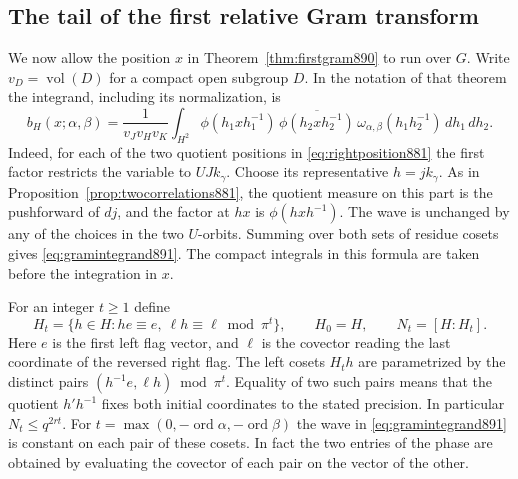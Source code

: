 \documentclass[a4paper,11pt]{article}
\theoremstyle{definition}
\theoremstyle{remark}
\numberwithin{equation}{section}
\begin{document}
\subsection{The tail of the first relative Gram transform}
\label{sec:gramtail891}

We now allow the position \(x\) in Theorem~\ref{thm:firstgram890}
to run over \(G\). Write \(v_D=\operatorname{vol}(D)\) for a compact
open subgroup \(D\). In the notation of that theorem the integrand,
including its normalization, is
\begin{equation}
 b_H(x;\alpha,\beta)=\frac{1}{v_Jv_Hv_K}
   \int_{H^2}\phi(h_1xh_1^{-1})\,
       \overline{\phi(h_2xh_2^{-1})}\,
       \omega_{\alpha,\beta}(h_1h_2^{-1})\,dh_1\,dh_2 .
 \label{eq:gramintegrand891}
\end{equation}
Indeed, for each of the two quotient positions in
\eqref{eq:rightposition881} the first factor restricts the
variable to \(U J k_\gamma\). Choose its representative \(h=j k_\gamma\).
As in Proposition~\ref{prop:twocorrelations881}, the quotient
measure on this part is the pushforward of \(dj\), and the factor
at \(hx\) is \(\phi(hxh^{-1})\). The wave is unchanged by any
of the choices in the two \(U\)-orbits. Summing over both
sets of residue cosets gives \eqref{eq:gramintegrand891}.
The compact integrals in this formula are taken before the
integration in \(x\).

For an integer \(t\ge1\) define
\[
 H_t=\{h\in H:he\equiv e,\ \ell h\equiv\ell\bmod\pi^t\},
 \qquad H_0=H,\qquad N_t=[H:H_t].
\]
Here \(e\) is the first left flag vector, and \(\ell\) is the
covector reading the last coordinate of the reversed right flag.
The left cosets \(H_t h\) are parametrized by the distinct pairs
\((h^{-1}e,\ell h)\bmod\pi^t\). Equality of two such pairs means
that the quotient \(h'h^{-1}\) fixes both initial coordinates to
the stated precision. In particular \(N_t\le q^{2rt}\).
For \(t=\max(0,-\operatorname{ord}\alpha,-\operatorname{ord}\beta)\)
the wave in \eqref{eq:gramintegrand891} is constant on each pair
of these cosets. In fact the two entries of the phase are obtained
by evaluating the covector of each pair on the vector of the other.
\end{document}
